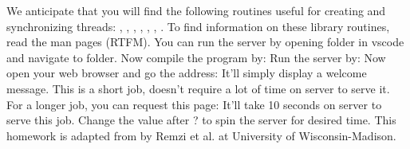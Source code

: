 {}We anticipate that you will find the following routines useful for creating and synchronizing threads: , , , , , , . To find information on these library routines, read the man pages (RTFM). \markdownRendererInterblockSeparator
{}\markdownRendererInterblockSeparator
{}You can run the server by opening folder in vscode and navigate to  folder. Now compile the program by:\markdownRendererInterblockSeparator
{} Run the server by:\markdownRendererInterblockSeparator
{} Now open your web browser and go the address:\markdownRendererInterblockSeparator
{} It'll simply display a welcome message. This is a short job, doesn't require a lot of time on server to serve it. For a longer job, you can request this page:\markdownRendererInterblockSeparator
{} It'll take 10 seconds on server to serve this job. Change the value after ? to spin the server for desired time.\markdownRendererInterblockSeparator
{}\markdownRendererInterblockSeparator
{}This homework is adapted from  by Remzi et al. at University of Wisconsin-Madison.\markdownRendererDocumentEnd